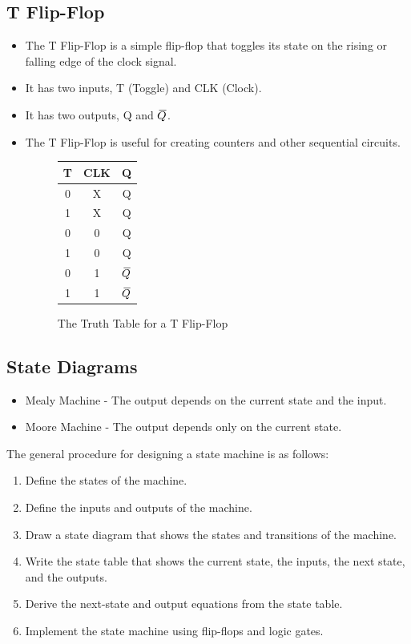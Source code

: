 \documentclass[12pt]{article}
\newcommand{\closure}[2][3]{%
	{}\mkern#1mu\overline{\mkern-#1mu#2}}
\begin{document}
\subsection{T Flip-Flop}
\begin{itemize}
	\item The T Flip-Flop is a simple flip-flop that toggles its state on the
	      rising or falling edge of the clock signal.
	\item It has two inputs, T (Toggle) and CLK (Clock).
	\item It has two outputs, Q and \(\closure{Q}\).
	\item The T Flip-Flop is useful for creating counters and other
	      sequential circuits.
	      \begin{figure}[H]
		      \centering
		      \begin{tabular}{|c|c|c|}
			      \hline
			      T & CLK & Q               \\
			      \hline
			      0 & X   & Q               \\
			      1 & X   & Q               \\
			      0 & 0   & Q               \\
			      1 & 0   & Q               \\
			      0 & 1   & \(\closure{Q}\) \\
			      1 & 1   & \(\closure{Q}\) \\
			      \hline
		      \end{tabular}
		      \caption{The Truth Table for a T Flip-Flop}
	      \end{figure}
\end{itemize}
\subsection{State Diagrams}
\begin{itemize}
	\item Mealy Machine - The output depends on the current state and the
	      input.
	\item Moore Machine - The output depends only on the current state.
\end{itemize}
The general procedure for designing a state machine is as follows:
\begin{enumerate}
	\item Define the states of the machine.
	\item Define the inputs and outputs of the machine.
	\item Draw a state diagram that shows the states and transitions of the
	      machine.
	\item Write the state table that shows the current state, the inputs, the
	      next state, and the outputs.
	\item Derive the next-state and output equations from the state table.
	\item Implement the state machine using flip-flops and logic gates.
\end{enumerate}
\end{document}
